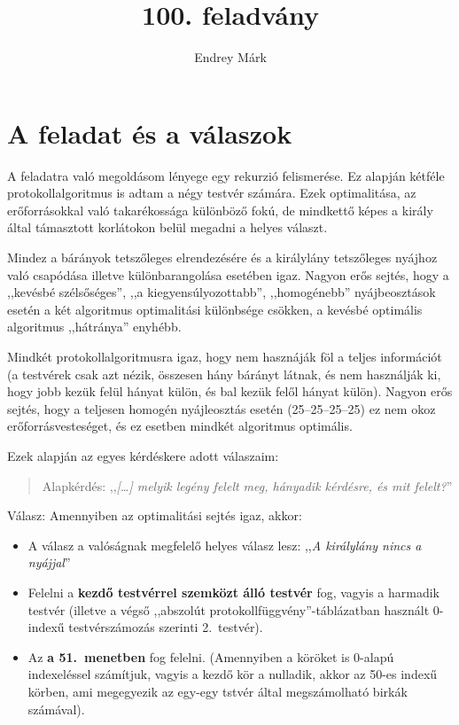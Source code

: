 \documentclass{article}
\title{100. feladvány}
\author{Endrey Márk}
\begin{document}
	\maketitle

	\tableofcontents

	\section{A feladat és a válaszok}

	A feladatra való megoldásom lényege egy rekurzió felismerése. Ez alapján kétféle protokollalgoritmus is adtam a négy testvér számára.
	Ezek optimalitása, az erőforrásokkal való takarékossága különböző fokú, de mindkettő képes a király által támasztott korlátokon belül megadni a helyes választ.

	Mindez a bárányok tetszőleges elrendezésére és a királylány tetszőleges nyájhoz való csapódása illetve különbarangolása esetében igaz.
	Nagyon erős sejtés, hogy a ,,kevésbé szélsőséges'', ,,a kiegyensúlyozottabb'', ,,homogénebb'' nyájbeosztások esetén a két algoritmus optimalitási különbsége csökken, a kevésbé optimális algoritmus ,,hátránya'' enyhébb.

	Mindkét protokollalgoritmusra igaz, hogy nem hasznáják föl a teljes információt (a testvérek csak azt nézik, összesen hány bárányt látnak, és nem használják ki, hogy jobb kezük felül hányat külön, és bal kezük felől hányat külön). Nagyon erős sejtés, hogy a teljesen homogén nyájleosztás esetén (25--25--25--25) ez nem okoz erőforrásvesteséget, és ez esetben mindkét algoritmus optimális.

	Ezek alapján az egyes  kérdéskere adott válaszaim:

	\begin{quotation}
		Alapkérdés: ,,\textit{[\dots] melyik legény felelt meg, hányadik kérdésre, és mit felelt?}''
	\end{quotation}

	Válasz: Amennyiben az optimalitási sejtés igaz, akkor:
	\begin{itemize}
		\item A válasz a valóságnak megfelelő helyes válasz lesz: ,,\textit{A királylány nincs a nyájjal}''
		\item Felelni a \textbf{kezdő testvérrel szemközt álló testvér} fog, vagyis a harmadik testvér (illetve a végső ,,abszolút protokollfüggvény''-táblázatban használt 0-indexű testvérszámozás szerinti 2.~testvér).
		\item Az \textbf{a 51.~menetben} fog felelni. (Amennyiben a köröket is 0-alapú indexeléssel számítjuk, vagyis a kezdő kör a nulladik, akkor az 50-es indexű körben, ami megegyezik az egy-egy tstvér által megszámolható birkák számával).
	\end{itemize}
\end{document}
